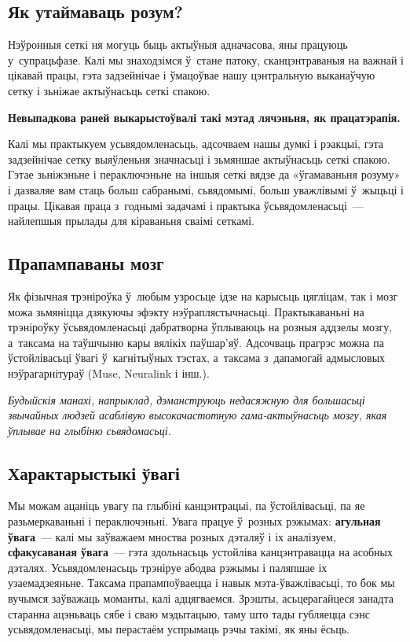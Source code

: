 \subsection*{Як утаймаваць розум?}

Нэўронныя сеткі ня могуць быць актыўныя адначасова, яны працуюць у~супрацьфазе. Калі мы знаходзімся ў~стане патоку, сканцэнтраваныя на важнай і цікавай працы, гэта задзейнічае і ўмацоўвае нашу цэнтральную выканаўчую сетку і зьніжае актыўнасьць сеткі спакою.

\textbf{Невыпадкова раней выкарыстоўвалі такі мэтад лячэньня, як працатэрапія.}

Калі мы практыкуем усьвядомленасьць, адсочваем нашы думкі і рэакцыі, гэта задзейнічае сетку выяўленьня значнасьці і зьмяншае актыўнасьць сеткі спакою. Гэтае зьніжэньне і пераключэньне на іншыя сеткі вядзе да «ўгамаваньня розуму» і дазваляе вам стаць больш сабранымі, сьвядомымі, больш уважлівымі ў~жыцьці і працы. Цікавая праца з~годнымі задачамі і практыка ўсьвядомленасьці~--- найлепшыя прылады для кіраваньня сваімі сеткамі.

\subsection*{Прапампаваны мозг}

Як фізычная трэніроўка ў~любым узросьце ідзе на карысьць цягліцам, так і мозг можа зьмяніцца дзякуючы эфэкту нэўраплястычнасьці. Практыкаваньні на трэніроўку ўсьвядомленасьці дабратворна ўплываюць на розныя аддзелы мозгу, а~таксама на таўшчыню кары вялікіх паўшар'яў. Адсочваць прагрэс можна па ўстойлівасьці ўвагі ў~кагнітыўных тэстах, а~таксама з~дапамогай адмысловых нэўрагарнітураў (Muse, Neuralink і інш.).

\emph{Будыйскія манахі, напрыклад, дэманструюць недасяжную для большасьці звычайных людзей асаблівую высокачастотную гама-актыўнасьць мозгу, якая ўплывае на глыбіню сьвядомасьці.}

\subsection*{Характарыстыкі ўвагі}

Мы можам ацаніць увагу па глыбіні канцэнтрацыі, па ўстойлівасьці, па яе разьмеркаваньні і пераключэньні. Увага працуе ў~розных рэжымах: \textbf{агульная ўвага}~--- калі мы заўважаем мноства розных дэталяў і іх аналізуем, \textbf{сфакусаваная ўвага}~--- гэта здольнасьць устойліва канцэнтравацца на асобных дэталях. Усьвядомленасьць трэніруе абодва рэжымы і паляпшае іх узаемадзеяньне. Таксама прапампоўваецца і навык мэта-ўважлівасьці, то бок мы вучымся заўважаць моманты, калі адцягваемся. Зрэшты, асьцерагайцеся занадта старанна ацэньваць сябе і сваю мэдытацыю, таму што тады губляецца сэнс усьвядомленасьці, мы перастаём успрымаць рэчы такімі, як яны ёсьць.

